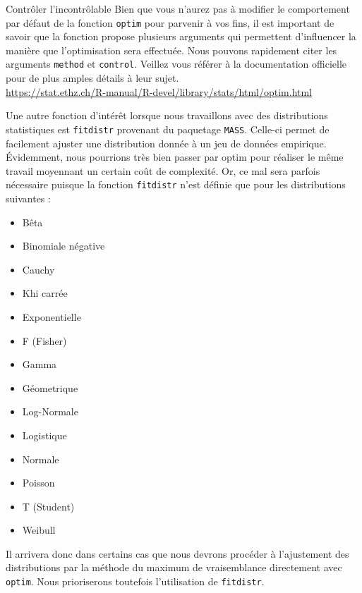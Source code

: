 
\begin{moreInfo}{Contrôler l'incontrôlable}
	Bien que vous n'aurez pas à modifier le comportement par défaut de la fonction \texttt{optim} pour parvenir à vos fins, il est important de savoir que la fonction propose plusieurs arguments qui permettent d'influencer la manière que l'optimisation sera effectuée. Nous pouvons rapidement citer les arguments \texttt{method} et \texttt{control}. Veillez vous référer à la documentation officielle pour de plus amples détails à leur sujet. \\
	\url{https://stat.ethz.ch/R-manual/R-devel/library/stats/html/optim.html}
\end{moreInfo}

Une autre fonction d'intérêt lorsque nous travaillons avec des distributions statistiques est \texttt{fitdistr} provenant du paquetage \texttt{MASS}. Celle-ci permet de facilement ajuster une distribution donnée à un jeu de données empirique. Évidemment, nous pourrions très bien passer par optim pour réaliser le même travail moyennant un certain coût de complexité. Or, ce mal sera parfois nécessaire puisque la fonction \texttt{fitdistr} n'est définie que pour les distributions suivantes : \cite{MASS}

\begin{multicols}{2}
	\begin{itemize}
		\item Bêta
		\item Binomiale négative
		\item Cauchy
		\item Khi carrée
		\item Exponentielle
		\item F (Fisher)
		\item Gamma
		\columnbreak
		\item Géometrique
		\item Log-Normale
		\item Logistique
		\item Normale
		\item Poisson
		\item T (Student)
		\item Weibull
	\end{itemize}
\end{multicols}

Il arrivera donc dans certains cas que nous devrons procéder à l'ajustement des distributions par la méthode du maximum de vraisemblance directement avec \texttt{optim}. Nous prioriserons toutefois l'utilisation de \texttt{fitdistr}. \\

